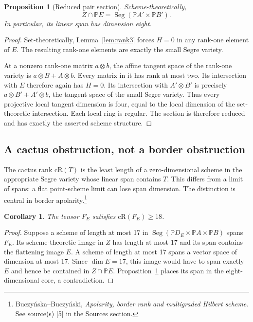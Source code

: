 \documentclass[11pt]{article}
\newtheorem{proposition}[theorem]{Proposition}
\newtheorem{corollary}[theorem]{Corollary}
\theoremstyle{definition}\newtheorem{definition}[theorem]{Definition}
\theoremstyle{remark}\newtheorem{remark}[theorem]{Remark}
\newcommand{\PP}{\mathbb P}
\newcommand{\crk}{\mathrm{cR}}
\newcommand{\Seg}{\operatorname{Seg}}
\newcommand{\src}[2]{\footnote{#1. See source(s) [#2] in the Sources section.}}
\begin{document}
\begin{proposition}[Reduced pair section]\label{prop:pairsection}
Scheme-theoretically,
\[
 Z\cap\PP E=\Seg(\PP A'\times\PP B').
\]
In particular, its linear span has dimension eight.
\end{proposition}
\begin{proof}
Set-theoretically, Lemma~\ref{lem:rank3} forces $H=0$ in any rank-one element
of $E$. The resulting rank-one elements are exactly the small Segre variety.

At a nonzero rank-one matrix $a\otimes b$, the affine tangent space of the
rank-one variety is $a\otimes B+A\otimes b$. Every matrix in it has rank at most
two. Its intersection with $E$ therefore again has $H=0$. Its intersection
with $A'\otimes B'$ is precisely
$a\otimes B'+A'\otimes b$, the tangent space of the small Segre variety. Thus
every projective local tangent dimension is four, equal to the local dimension
of the set-theoretic intersection. Each local ring is regular. The section is
therefore reduced and has exactly the asserted scheme structure.
\end{proof}

\subsection{A cactus obstruction, not a border obstruction}

The cactus rank $\crk(T)$ is the least length of a zero-dimensional scheme in
the appropriate Segre variety whose linear span contains $T$. This differs
from a limit of spans: a flat point-scheme limit can lose span dimension.
The distinction is central in border apolarity.\src{Buczy\'nska--Buczy\'nski,
\emph{Apolarity, border rank and multigraded Hilbert scheme}}{5}

\begin{corollary}\label{cor:FEcactus}
The tensor $F_E$ satisfies $\crk(F_E)\geq18$.
\end{corollary}
\begin{proof}
Suppose a scheme of length at most 17 in
$\Seg(\PP D_E\times\PP A\times\PP B)$ spans $F_E$. Its scheme-theoretic image
in $Z$ has length at most 17 and its span contains the flattening image $E$.
A scheme of length at most 17 spans a vector space of dimension at most 17.
Since $\dim E=17$, this image would have to span exactly $E$ and hence be
contained in $Z\cap\PP E$. Proposition~\ref{prop:pairsection} places its span
in the eight-dimensional core, a contradiction.
\end{proof}
\end{document}
